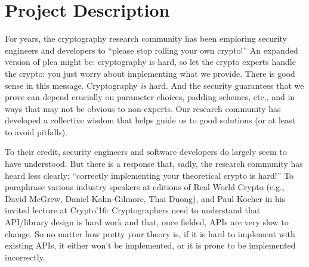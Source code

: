 \section{Project Description}
\label{sec:intro}

For years, the cryptography research community has been emploring security
engineers and developers to ``please stop rolling your own crypto!''  An
expanded version of plea might be: cryptography is hard, so let the crypto experts
handle the crypto; you just worry about implementing what we provide.  There is
good sense in this message.  Cryptography \emph{is} hard.  And the security
guarantees that we prove can depend crucially on parameter choices, padding
schemes, etc., and in ways that may not be obvious to non-experts. Our
research community has developed a collective wisdom that helps guide us to good
solutions (or at least to avoid pitfalls).

To their credit, security engineers and software developers do largely seem to
have understood.  But there is a response that, sadly, the research community
has heard less clearly: ``correctly implementing your theoretical crypto is hard!''
To paraphrase various industry speakers at editions of Real World Crypto (e.g.,
David McGrew, Daniel Kahn-Gilmore, Thai Duong),
and Paul Kocher in his invited lecture at Crypto'16:
%
Cryptographers need to understand that API/library design is hard work and that,
once fielded, APIs are very slow to change.  
So no matter how pretty your theory is, if it is hard to implement
with existing APIs, it either won't be implemented, or it
is prone to be implemented incorrectly.  

